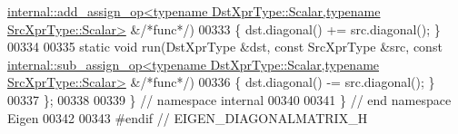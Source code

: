 \begin{DoxyCode}
      \hyperlink{struct_eigen_1_1internal_1_1add__assign__op}{internal::add\_assign\_op<typename DstXprType::Scalar,typename SrcXprType::Scalar>}
       &\textcolor{comment}{/*func*/})
00333   \{ dst.diagonal() += src.diagonal(); \}
00334   
00335   \textcolor{keyword}{static} \textcolor{keywordtype}{void} run(DstXprType &dst, \textcolor{keyword}{const} SrcXprType &src, \textcolor{keyword}{const} 
      \hyperlink{struct_eigen_1_1internal_1_1sub__assign__op}{internal::sub\_assign\_op<typename DstXprType::Scalar,typename SrcXprType::Scalar>}
       &\textcolor{comment}{/*func*/})
00336   \{ dst.diagonal() -= src.diagonal(); \}
00337 \};
00338 
00339 \} \textcolor{comment}{// namespace internal}
00340 
00341 \} \textcolor{comment}{// end namespace Eigen}
00342 
00343 \textcolor{preprocessor}{#endif // EIGEN\_DIAGONALMATRIX\_H}
\end{DoxyCode}
